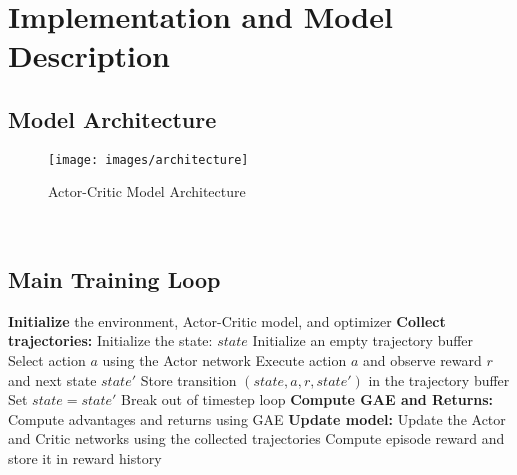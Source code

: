 \section{Implementation and Model Description}
\label{sec:implementation-and-model-description}

\subsection{Model Architecture}
\label{subsec:model-architecture}

\begin{figure}[H]
    \centering
    \texttt{[image: images/architecture]}
    \caption{Actor-Critic Model Architecture}
    \label{fig:model-architecture}
\end{figure}\

\subsection{Main Training Loop}
\label{subsec:main-training-loop}
\begin{algorithmic}
    \State \textbf{Initialize} the environment, Actor-Critic model, and optimizer
        \State \textbf{Collect trajectories:}
        \State \hspace{1em} Initialize the state: $state$
        \State \hspace{1em} Initialize an empty trajectory buffer
            \State \hspace{1em} Select action $a$ using the Actor network
            \State \hspace{1em} Execute action $a$ and observe reward $r$ and next state $state'$
            \State \hspace{1em} Store transition $(state, a, r, state')$ in the trajectory buffer
            \State \hspace{1em} Set $state = state'$
                \State \hspace{1em} Break out of timestep loop
            \EndIf
        \EndFor
        \State \textbf{Compute GAE and Returns:}
        \State \hspace{1em} Compute advantages and returns using GAE
        \State \textbf{Update model:}
        \State \hspace{1em} Update the Actor and Critic networks using the collected trajectories
        \State \hspace{1em} Compute episode reward and store it in reward history
    \EndFor
\end{algorithmic}

